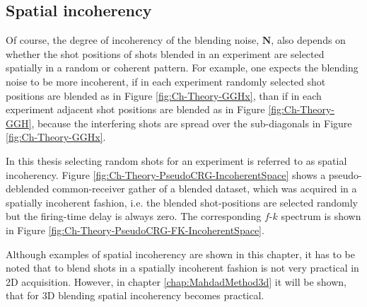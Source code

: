 \subsection*{Spatial incoherency}

Of course, the degree of incoherency of the blending noise, $\mathbf{N}$, also depends on whether the shot positions of shots blended in an experiment are selected spatially in a random or coherent pattern. For example, one expects the blending noise to be more incoherent, if in each experiment randomly selected shot positions are blended as in Figure \ref{fig:Ch-Theory-GGHx}, than if in each experiment adjacent shot positions are blended as in Figure \ref{fig:Ch-Theory-GGH}, because the interfering shots are spread over the sub-diagonals in Figure \ref{fig:Ch-Theory-GGHx}.

In this thesis selecting random shots for an experiment is referred to as spatial incoherency. Figure \ref{fig:Ch-Theory-PseudoCRG-IncoherentSpace} shows a pseudo-deblended common-receiver gather of a blended dataset, which was acquired in a spatially incoherent fashion, i.e. the blended shot-positions are selected randomly but the firing-time delay is always zero. The corresponding $f$-$k$ spectrum is shown in Figure \ref{fig:Ch-Theory-PseudoCRG-FK-IncoherentSpace}.

Although examples of spatial incoherency are shown in this chapter, it has to be noted that to blend shots in a spatially incoherent fashion is not very practical in 2D acquisition. However, in chapter \ref{chap:MahdadMethod3d} it will be shown, that for 3D blending spatial incoherency becomes practical.

